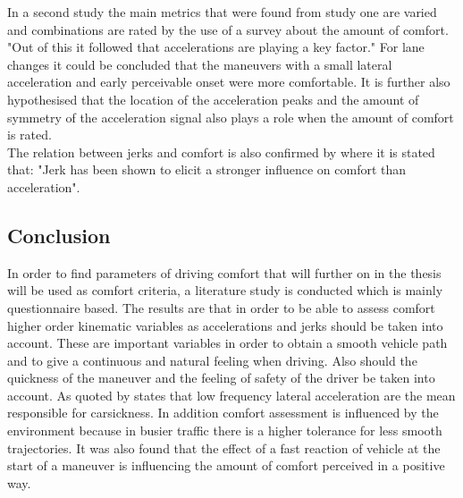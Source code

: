 In a second study the main metrics that were found from study one are varied and combinations are rated by the use of a survey about the amount of comfort. "Out of this it followed that accelerations are playing a key factor." \cite{Bellem} For lane changes it could be concluded that the maneuvers with a small lateral acceleration and early perceivable onset were more comfortable. It is further also hypothesised that the location of the acceleration peaks and the amount of symmetry of the acceleration signal also plays a role when the amount of comfort is rated.\\

The relation between jerks and comfort is also confirmed by \cite{Gianna1996} where it is stated that: "Jerk has been shown to elicit a stronger influence on comfort than acceleration".




\subsection{Conclusion}
In order to find parameters of driving comfort that will further on in the thesis will be used as comfort criteria, a literature study is conducted which is mainly questionnaire based. The results are that in order to be able to assess comfort higher order kinematic variables as accelerations and jerks should be taken into account. These are important variables in order to obtain a smooth vehicle path and to give a continuous and natural feeling when driving. Also should the quickness of the maneuver and the feeling of safety of the driver be taken into account. As quoted by \cite{Turner1999} states that low frequency lateral acceleration are the mean responsible for carsickness. In addition comfort assessment is influenced by the environment because in busier traffic there is a higher tolerance for less smooth trajectories. It was also found that the effect of a fast reaction of vehicle at the start of a maneuver is influencing the amount of comfort perceived in a positive way.


